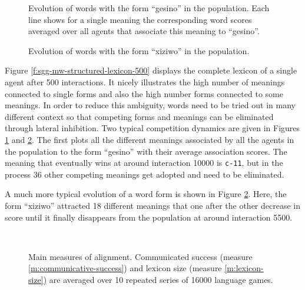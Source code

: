 \startfiguregroup


\begin{figure}[t]
  \caption{Evolution of words with the form ``gesino'' in the
    population. Each line shows for a single meaning the corresponding
    word scores averaged over all agents that associate this meaning
    to ``gesino''. }
  \label{f:sgg-mw-structured-word-meaning-scores-gesino}
\end{figure}

\begin{figure}[t]
  \caption{Evolution of words with the form ``xiziwo'' in the
    population. }
  \label{f:sgg-mw-structured-word-meaning-scores-xiziwo}
\end{figure}

\stopfiguregroup


Figure \ref{f:sgg-mw-structured-lexicon-500} displays the complete
lexicon of a single agent after 500 interactions. It nicely
illustrates the high number of meanings connected to single forms and
also the high number forms connected to some meanings. In order to
reduce this ambiguity, words need to be tried out in many different
context so that competing forms and meanings can be eliminated through
lateral inhibition. Two typical competition dynamics are given in
Figures \ref{f:sgg-mw-structured-word-meaning-scores-gesino} and
\ref{f:sgg-mw-structured-word-meaning-scores-xiziwo}. The first plots
all the different meanings associated by all the agents in the
population to the form ``gesino'' with their average association
scores. The meaning that eventually wins at around interaction 10000
is \texttt{c-11}, but in the process 36 other competing meanings get
adopted and need to be eliminated. 

A much more typical evolution of a word form is shown in Figure
\ref{f:sgg-mw-structured-word-meaning-scores-xiziwo}. Here, the form
``xiziwo'' attracted 18 different meanings that one after the other
decrease in score until it finally disappears from the population at
around interaction 5500.

~\\

\startfiguregroup

\begin{figure}[t]
  \caption{Main measures of alignment. Communicated success (measure
    \ref{m:communicative-success}) and lexicon size (measure
    \ref{m:lexicon-size}) are averaged over 10 repeated series of 16000
    language games.}
  \label{f:sgg-mw-structured-success+lexicon-size}
\end{figure}


